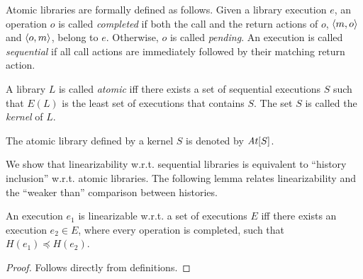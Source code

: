 Atomic libraries are formally defined as follows. Given a library execution $e$, an 
operation $o$ is called \emph{completed} if both the call and the return actions of $o$, 
$\left\langle {m,o} \right\rangle$ and $\left\langle {o,m} \right\rangle$, belong to $e$. Otherwise, $o$ is called \emph{pending}. 
An execution is called 
\emph{sequential} if all call actions are immediately followed by their matching 
return action. %

\begin{definition}

A library $L$ is called \emph{atomic} iff there exists a set of sequential executions $S$ such that 
$E(L)$ is the least set of executions that contains $S$. The set $S$ is called the \emph{kernel} of $L$.

\end{definition}
The atomic library defined by a kernel $S$ is denoted by $\mathit{At}[{S}]$.

\begin{example}


\end{example}


We show that linearizability w.r.t. sequential libraries is equivalent to ``history inclusion'' w.r.t. atomic libraries.
The following lemma relates linearizability and the ``weaker than'' comparison between histories.

\begin{lemma}
  \label{prop:lin}

  An execution $e_1$ is linearizable w.r.t. a set of executions $E$ iff there exists an
  execution $e_2\in E$, where every operation is completed, such that
  $H(e_1)\preceq H(e_2)$.

\end{lemma}

\begin{proof}

Follows directly from definitions.

\end{proof}

